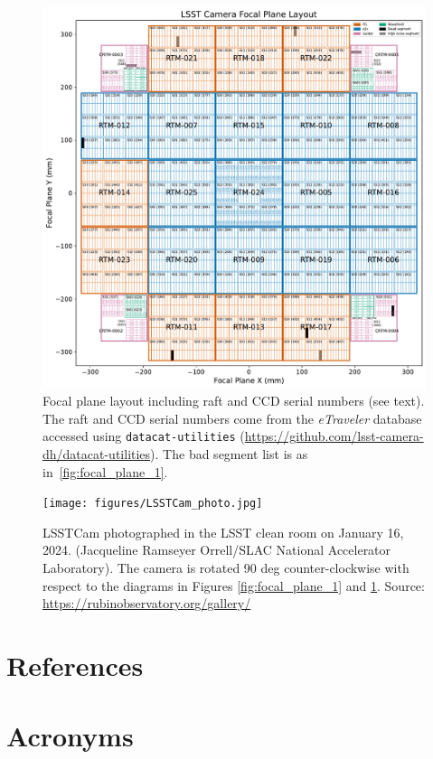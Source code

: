 \documentclass[OPS,lsstdraft,authoryear,toc]{lsstdoc}
\begin{document}
\begin{figure}
  \centering
  \includegraphics[width=\textwidth]{figures/LSSTCam_focal_plane_CTN_001_FIG2.pdf}
	\caption{Focal plane layout including raft and CCD serial numbers (see text). The raft and CCD serial numbers come from the \emph{eTraveler} database accessed using {\tt{datacat-utilities}} (\url{https://github.com/lsst-camera-dh/datacat-utilities}). The bad segment list is as in~\ref{fig:focal_plane_1}.}
  \label{fig:focal_plane_2}
\end{figure}

\clearpage

\begin{figure}
  \centering
  \texttt{[image: figures/LSSTCam\_photo.jpg]}
  \caption{LSSTCam photographed in the LSST clean room on January 16, 2024. (Jacqueline Ramseyer Orrell/SLAC National Accelerator Laboratory). The camera is rotated 90 deg counter-clockwise with respect to the diagrams in Figures \ref{fig:focal_plane_1} and \ref{fig:focal_plane_2}. Source: \url{https://rubinobservatory.org/gallery/}}
  \label{fig:focal_plane_3}
\end{figure}

\appendix

\section{References} \label{sec:bib}
\renewcommand{\refname}{} %


\section{Acronyms} \label{sec:acronyms}

\end{document}
